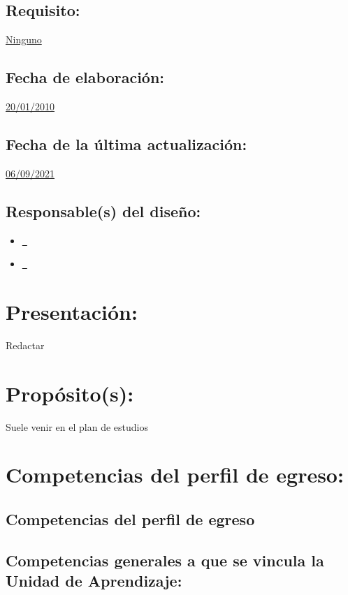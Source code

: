 \documentclass[10 pt]{article}
\begin{document}
\subsection{Requisito:} \underline{Ninguno} %
\subsection{Fecha de elaboraci\'{o}n:} \underline{20/01/2010}
\subsection{Fecha de la \'{u}ltima actualizaci\'{o}n:} \underline{06/09/2021}
\subsection{Responsable(s) del dise\~{n}o:}
\begin{itemize}[label={}]
\item \underline{\narturo~\arturo} %
\item \underline{\nelisa~\elisa} %
\end{itemize}
\newpage
\section{Presentaci\'{o}n:}

Redactar

\section{Prop\'{o}sito(s):}

Suele venir en el plan de estudios

\section{Competencias del perfil de egreso:}
\subsection{Competencias del perfil de egreso}




  
\subsection{Competencias generales a que se vincula la Unidad de
    Aprendizaje:}
\end{document}
